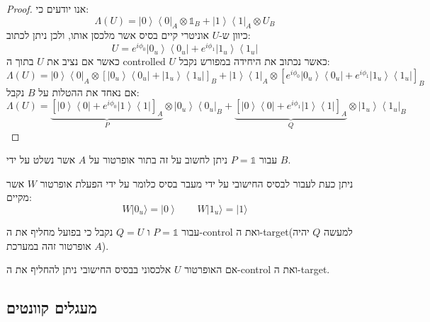 \documentclass{tstextbook}
\begin{document}
\begin{proof}
אנו יודעים כי:
$$\Lambda\left(U\right)=\left|0\right\rangle\left\langle0\right|_{A}\otimes\mathbb{1}_{B}+\left|1\right\rangle\left\langle1\right|_{A}\otimes U_{B}$$
כיוון ש-\(U\) אוניטרי קיים בסיס אשר מלכסן אותו, ולכן ניתן לכתוב:
$$U=e^{i\phi_{0}}\left|0_{u}\right\rangle\left\langle0_{u}\right|+e^{i\phi_{1}}\left|1_{u}\right\rangle\left\langle1_{u}\right|$$
כאשר אם נציב את \(U\) בתוך ה controlled \(U\) כאשר נכתוב את היחידה במפורש נקבל:
$$\Lambda\left(U\right)=\left|0\right\rangle\left\langle0\right|_{A}\otimes\left[\left|0_{u}\right\rangle\left\langle0_{u}\right|+\left|1_{u}\right\rangle\left\langle1_{u}\right|\right]_{B}+\left|1\right\rangle\left\langle1\right|_{A}\otimes\left[e^{i\phi_{0}}\left|0_{u}\right\rangle\left\langle0_{u}\right|+e^{i\phi_{1}}\left|1_{u}\right\rangle\left\langle1_{u}\right|\right]_{B}$$
אם נאחד את ההטלות על \(B\) נקבל:
$$\Lambda\left(U\right)=\underbrace{ \left[\left|0\right\rangle\left\langle0\right|+e^{i\phi_{0}}\left|1\right\rangle\left\langle1\right|\right]_{A} }_{ P }\otimes\left|0_{u}\right\rangle\left\langle0_{u}\right|_{B}+\underbrace{ \left[\left|0\right\rangle\left\langle0\right|+e^{i\phi_{1}}\left|1\right\rangle\left\langle1\right|\right]_{A} }_{ Q }\otimes\left|1_{u}\right\rangle\left\langle1_{u}\right|_{B}$$

\end{proof}
\begin{corollary}
עבור \(P=\mathbb{1}\) ניתן לחשוב על זה בתור אופרטור על \(A\) אשר נשלט על ידי \(B\).

\end{corollary}
\begin{corollary}
ניתן כעת לעבור לבסיס החישובי על ידי מעבר בסיס כלומר על ידי הפעלת אופרטור \(W\) אשר מקיים:
$$W|0_{u}\rangle=\left|0\right\rangle \qquad W|1_{u}\rangle=|1\rangle$$

\end{corollary}
\begin{proposition}
עבור \(P=\mathbb{1}\) ו \(Q=U\) נקבל כי בפועל מחליף את ה-control ואת ה-target(למעשה \(Q\) יהיה אופרטור זהה במערכת \(A\)).

\end{proposition}
\begin{corollary}
אם האופרטור \(U\) אלכסוני בבסיס החישובי ניתן להחליף את ה-control ואת ה-target.

\end{corollary}
\subsection{מעגלים קוונטים}
\end{document}
